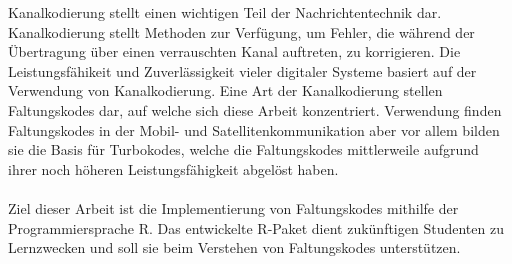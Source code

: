 Kanalkodierung stellt einen wichtigen Teil der Nachrichtentechnik dar. Kanalkodierung stellt Methoden zur Verfügung, um Fehler, die während der Übertragung über einen verrauschten Kanal auftreten, zu korrigieren. Die Leistungsfähikeit und Zuverlässigkeit vieler digitaler Systeme basiert auf der Verwendung von Kanalkodierung. Eine Art der Kanalkodierung stellen Faltungskodes dar, auf welche sich diese Arbeit konzentriert. Verwendung finden Faltungskodes in der Mobil- und Satellitenkommunikation aber vor allem bilden sie die Basis für Turbokodes, welche die Faltungskodes mittlerweile aufgrund ihrer noch höheren Leistungsfähigkeit abgelöst haben.
\\
\\
Ziel dieser Arbeit ist die Implementierung von Faltungskodes mithilfe der Programmiersprache R. Das entwickelte R-Paket dient zukünftigen Studenten zu Lernzwecken und soll sie beim Verstehen von Faltungskodes unterstützen.